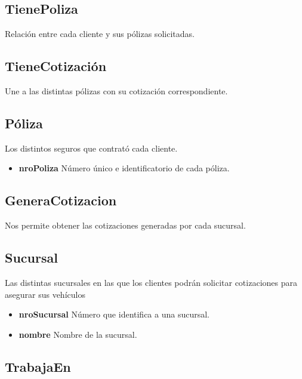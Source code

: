 \documentclass[a4paper,11pt]{article}
\begin{document}
\subsection{TienePoliza}

Relación entre cada cliente y sus pólizas solicitadas.

\subsection{TieneCotización}

Une a las distintas pólizas con su cotización correspondiente.

\subsection{Póliza}

Los distintos seguros que contrató cada cliente.

\begin{itemize}
   
  \item \textbf{nroPoliza} Número único e identificatorio de cada póliza.
      
\end{itemize}

\subsection{GeneraCotizacion}

Nos permite obtener las cotizaciones generadas por cada sucursal.

\subsection{Sucursal}

Las distintas sucursales en las que los clientes podrán solicitar cotizaciones para asegurar sus vehículos

\begin{itemize}
   
  \item \textbf{nroSucursal} Número que identifica a una sucursal.
  
  \item \textbf{nombre} Nombre de la sucursal.
  
\end{itemize}

\subsection{TrabajaEn}
\end{document}
